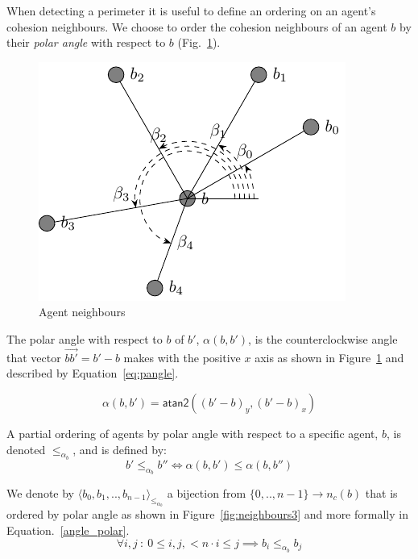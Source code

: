 \documentclass[12pt,a4paper]{IEEEtran}
\newcommand{\vbb}[2]{#2-#1}
\newcommand{\pangle}{\mathit{\alpha}}
\newcommand{\leqaz}[3]{#2 \leq_{\pangle_#1} #3}
\newcommand{\angleordered}[2]{\langle #2 \rangle_{\leqaz{#1}{}{}}}
\begin{document}
When detecting a perimeter it is useful to define an ordering on an agent's cohesion neighbours. We choose to order the cohesion neighbours of an agent $b$ by their \emph{polar
angle} with respect to $b$ (Fig.~\ref{fig:neighbours2}). 

\begin{figure}[H]
	\centering
	\includegraphics[width=0.8\linewidth]{figures/neighbours2}
	\caption[Agent neighbours]{Agent neighbours}
	\label{fig:neighbours2}
\end{figure}

The polar angle with respect to $b$ of $b'$,
$\pangle(b, b')$, is the counterclockwise angle that vector $\vec{bb'} = b' -
b$ makes with the positive $x$ axis as shown in Figure~\ref{fig:neighbours2} and described by Equation~\ref{eq:pangle}.

\begin{equation}\label{eq:pangle}
	\pangle(b, b') = \mathsf{atan2}((\vbb{b}{b'})_y, (\vbb{b}{b'})_x)
\end{equation} 

A partial ordering of agents by polar angle with respect to a specific agent,
$b$, is denoted $\leqaz{b}{}{}$, and is defined by: 
\begin{equation}\label{angle_ordering}
	\leqaz{b}{b'}{b''} \iff \pangle(b, b') \leq \pangle(b, b'')
\end{equation}

We denote by $\angleordered{b}{b_0, b_1, .., b_{n-1}}$ a bijection from $\{0,.., n-1\} \rightarrow n_c(b)$ that is ordered by polar angle as shown in Figure~\ref{fig:neighbours3} and more formally in Equation.~\ref{angle_polar}.
\begin{equation}\label{angle_polar}
	\forall i,
j~:~0 \leq i, j, < n \cdot i \leq j \implies \leqaz{b}{b_i}{b_j}
\end{equation}
\end{document}
